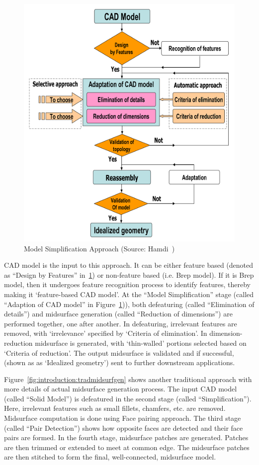 
	\begin{figure} [!h]
		\centering
		\includegraphics[width=0.75\linewidth]{images/BlockDiagramSampleHamdi}
		\caption{Model Simplification Approach (Source: Hamdi~\cite{Hamdi2005})}
		\label{fig:introduction:hamdimids}
	\end{figure} 


CAD model is the input to this approach. It can be either feature based (denoted as ``Design by Features'' in~\ref{fig:introduction:hamdimids}) or non-feature based (i.e. Brep model). If it is Brep model, then it undergoes feature recognition process to identify features, thereby making it `feature-based CAD model'.  At the ``Model Simplification'' stage (called ``Adaption of CAD model'' in Figure~\ref{fig:introduction:hamdimids})), both defeaturing (called ``Elimination of details'') and midsurface generation (called ``Reduction of dimensions'') are performed together, one after another. In defeaturing, irrelevant features are removed, with `irrelevance' specified by `Criteria of elimination'. In dimension-reduction midsurface is generated, with `thin-walled' portions selected based on `Criteria of reduction'. The output midsurface is validated and if successful, (shown as as `Idealized geometry') sent to further downstream applications.

Figure~\ref{fig:introduction:tradmidsurfgen} shows another traditional approach with more details of actual midsurface generation process. The input CAD model (called ``Solid Model'') is defeatured in the second stage (called ``Simplification''). Here, irrelevant features such as small fillets, chamfers, etc. are removed. Midsurface computation is done using Face pairing approach. The  third stage (called ``Pair Detection'') shows how opposite faces are detected and their face pairs are formed. In the fourth stage, midsurface patches are generated. Patches are then trimmed or extended to meet at common edge. The midsurface patches are then stitched to form the final, well-connected, midsurface model.

